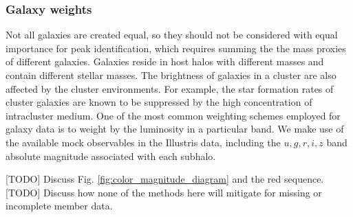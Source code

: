 \subsubsection{Galaxy weights}
\label{subsubsec:galaxy_weights}

Not all galaxies are created equal, so they should not be considered with equal
importance for peak identification, which requires summing the
the mass proxies of different galaxies. 
Galaxies reside in host halos with different masses and 
contain different stellar masses. The brightness of galaxies in a cluster are 
also affected by the cluster environments.
For example, the star formation rates of cluster galaxies are known to be 
suppressed by the high concentration of intracluster medium. 
One of the most common weighting schemes employed for galaxy data is to weight
by the luminosity in a particular band.
We make use of the available mock observables in the Illustris data, including 
the $u, g, r, i, z$ band absolute magnitude associated with each subhalo. 

[TODO] Discuss Fig. \ref{fig:color_magnitude_diagram} and the red sequence.
[TODO] Discuss how none of the methods here will mitigate for missing or
incomplete member data. 



